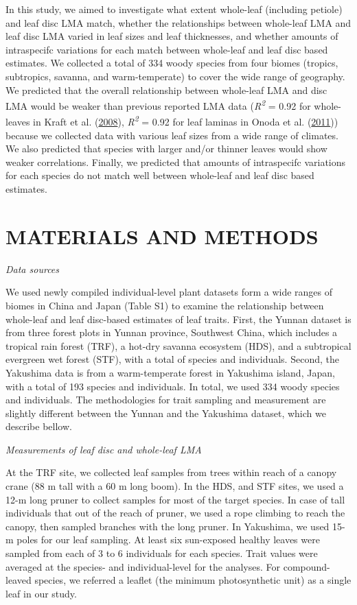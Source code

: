 \documentclass[
  12pt,
  a4paper,
,tablecaptionabove
]{scrartcl}
\begin{document}
In this study, we aimed to investigate what extent whole-leaf (including
petiole) and leaf disc LMA match, whether the relationships between
whole-leaf LMA and leaf disc LMA varied in leaf sizes and leaf
thicknesses, and whether amounts of intraspecifc variations for each
match between whole-leaf and leaf disc based estimates. We collected a
total of 334 woody species from four biomes (tropics, subtropics,
savanna, and warm-temperate) to cover the wide range of geography. We
predicted that the overall relationship between whole-leaf LMA and disc
LMA would be weaker than previous reported LMA data
(\emph{R\textsuperscript{2}} = 0.92 for whole-leaves in Kraft et al.
(\protect\hyperlink{ref-Kraft2008}{2008}), \emph{R\textsuperscript{2}} =
0.92 for leaf laminas in Onoda et al.
(\protect\hyperlink{ref-Onoda2011}{2011})) because we collected data
with various leaf sizes from a wide range of climates. We also predicted
that species with larger and/or thinner leaves would show weaker
correlations. Finally, we predicted that amounts of intraspecifc
variations for each species do not match well between whole-leaf and
leaf disc based estimates.

\hypertarget{materials-and-methods}{%
\section{MATERIALS AND METHODS}\label{materials-and-methods}}

\emph{Data sources}

We used newly compiled individual-level plant datasets form a wide
ranges of biomes in China and Japan (Table S1) to examine the
relationship between whole-leaf and leaf disc-based estimates of leaf
traits. First, the Yunnan dataset is from three forest plots in Yunnan
province, Southwest China, which includes a tropical rain forest (TRF),
a hot-dry savanna ecosystem (HDS), and a subtropical evergreen wet
forest (STF), with a total of species and individuals. Second, the
Yakushima data is from a warm-temperate forest in Yakushima island,
Japan, with a total of 193 species and individuals. In total, we used
334 woody species and individuals. The methodologies for trait sampling
and measurement are slightly different between the Yunnan and the
Yakushima dataset, which we describe bellow.

\emph{Measurements of leaf disc and whole-leaf LMA}

At the TRF site, we collected leaf samples from trees within reach of a
canopy crane (88 m tall with a 60 m long boom). In the HDS, and STF
sites, we used a 12-m long pruner to collect samples for most of the
target species. In case of tall individuals that out of the reach of
pruner, we used a rope climbing to reach the canopy, then sampled
branches with the long pruner. In Yakushima, we used 15-m poles for our
leaf sampling. At least six sun-exposed healthy leaves were sampled from
each of 3 to 6 individuals for each species. Trait values were averaged
at the species- and individual-level for the analyses. For
compound-leaved species, we referred a leaflet (the minimum
photosynthetic unit) as a single leaf in our study.
\end{document}

